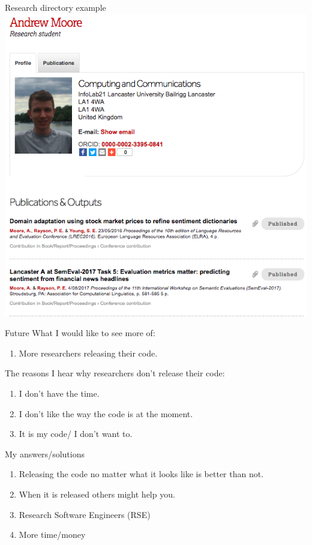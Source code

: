 \documentclass[10pt]{beamer}
\begin{document}
\begin{frame}{Research directory example}
\centering
\includegraphics[scale=0.3]{publication.png}
\end{frame}

\begin{frame}{Future}
What I would like to see more of:
\begin{enumerate}
\item More researchers releasing their code.
\end{enumerate}
The reasons I hear why researchers don't release their code:
\begin{enumerate}
\item I don't have the time.
\item I don't like the way the code is at the moment.
\item It is my code/ I don't want to.
\end{enumerate}
\end{frame}

\begin{frame}{My answers/solutions}
\begin{enumerate}
\item Releasing the code no matter what it looks like is better than not.
\item When it is released others might help you.
\item Research Software Engineers (RSE)
\item More time/money
\end{enumerate}
\end{frame}
\end{document}
